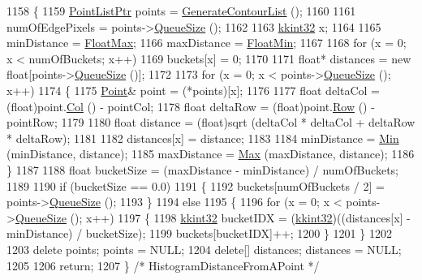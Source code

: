 \begin{DoxyCode}
1158 \{
1159   \hyperlink{class_k_k_b_1_1_point_list}{PointListPtr}  points = \hyperlink{class_k_k_b_1_1_contour_follower_a34906be662b959eda2b11a45f49c5aa9}{GenerateContourList} ();
1160 
1161   numOfEdgePixels = points->\hyperlink{class_k_k_b_1_1_k_k_queue_a1dab601f75ee6a65d97f02bddf71c40d}{QueueSize} ();
1162   
1163   \hyperlink{namespace_k_k_b_a8fa4952cc84fda1de4bec1fbdd8d5b1b}{kkint32}  x;
1164 
1165   minDistance = \hyperlink{namespace_k_k_b_ae17198c2bfe6bff1db2be8bb83f51929}{FloatMax};
1166   maxDistance = \hyperlink{namespace_k_k_b_ab02e2be56dc2602d9fe757f5261ebc4c}{FloatMin};
1167 
1168   \textcolor{keywordflow}{for}  (x = 0;  x < numOfBuckets;  x++)
1169     buckets[x] = 0;
1170 
1171   \textcolor{keywordtype}{float}*  distances = \textcolor{keyword}{new} \textcolor{keywordtype}{float}[points->\hyperlink{class_k_k_b_1_1_k_k_queue_a1dab601f75ee6a65d97f02bddf71c40d}{QueueSize} ()];
1172 
1173   \textcolor{keywordflow}{for}  (x = 0;  x < points->\hyperlink{class_k_k_b_1_1_k_k_queue_a1dab601f75ee6a65d97f02bddf71c40d}{QueueSize} ();  x++)
1174   \{
1175     \hyperlink{class_k_k_b_1_1_point}{Point}& point = (*points)[x];
1176 
1177     \textcolor{keywordtype}{float}  deltaCol = (float)point.\hyperlink{class_k_k_b_1_1_point_afb196b03757fc697f6ade0129a1c7fcf}{Col} () - pointCol;
1178     \textcolor{keywordtype}{float}  deltaRow = (float)point.\hyperlink{class_k_k_b_1_1_point_abfc34bcf809fc9fb95baf5c745b07549}{Row} () - pointRow;
1179 
1180     \textcolor{keywordtype}{float}  distance = (float)sqrt (deltaCol * deltaCol  +  deltaRow  * deltaRow);
1181 
1182     distances[x] = distance;
1183 
1184     minDistance = \hyperlink{namespace_k_k_b_ad030d1ca8bd5038824c4a923a4d23fb5}{Min} (minDistance, distance);
1185     maxDistance = \hyperlink{namespace_k_k_b_a25e187e24c091586293725f27f007ad7}{Max} (maxDistance, distance);
1186   \}
1187 
1188   \textcolor{keywordtype}{float}  bucketSize = (maxDistance - minDistance) / numOfBuckets;
1189 
1190   \textcolor{keywordflow}{if}  (bucketSize == 0.0)
1191   \{
1192      buckets[numOfBuckets / 2] = points->\hyperlink{class_k_k_b_1_1_k_k_queue_a1dab601f75ee6a65d97f02bddf71c40d}{QueueSize} ();
1193   \}
1194   \textcolor{keywordflow}{else}
1195   \{
1196     \textcolor{keywordflow}{for}  (x = 0;  x < points->\hyperlink{class_k_k_b_1_1_k_k_queue_a1dab601f75ee6a65d97f02bddf71c40d}{QueueSize} ();  x++)
1197     \{
1198       \hyperlink{namespace_k_k_b_a8fa4952cc84fda1de4bec1fbdd8d5b1b}{kkint32} bucketIDX = (\hyperlink{namespace_k_k_b_a8fa4952cc84fda1de4bec1fbdd8d5b1b}{kkint32})((distances[x] - minDistance) / bucketSize);
1199       buckets[bucketIDX]++;
1200     \}
1201   \}
1202 
1203   \textcolor{keyword}{delete}    points;     points    = NULL;
1204   \textcolor{keyword}{delete}[]  distances;  distances = NULL;
1205 
1206   \textcolor{keywordflow}{return};
1207 \}  \textcolor{comment}{/* HistogramDistanceFromAPoint */}
\end{DoxyCode}


